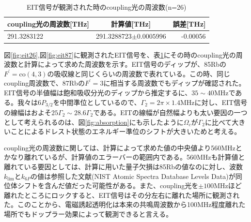 \documentclass[dvipdfmx]{jsarticle}
\begin{document}
\begin{table}[hbtp]
  \caption{EIT信号が観測された時のcoupling光の周波数(n=26)}
  \label{table:eit26}
  \centering
  \begin{tabular}{lcr}
    \hline
    coupling光の周波数[THz] & 計算値[THz] & 誤差[THz]  \\
    \hline \hline
    291.3283122  & 291.3288723$\pm 0.0005996$ & -0.00056  \\
    \hline
  \end{tabular}
\end{table}
図\ref{fig:eit26},図\ref{fig:eit87}に観測されたEIT信号を、表\ref{table:eit26}にその時のcoupling光の周波数と計算によって求めた周波数を示す。EIT信号のディップが、85Rbの$F^{'} = \text{co}(4,3)$の吸収線と同じくらいの周波数で表れている。この時、同じcoupling周波数で、87Rbの$F^{'} = 3$に相当する周波数でもディップが確認された。EIT信号の半値幅は飽和吸収分光のディップから推定するに、$35 \sim 40$MHzである。我々は$6P_{3/2}$を中間準位としているので、$\Gamma_2 = 2\pi \times 1.4$MHzに対し、EIT信号の線幅はおよそ$25\Gamma_2 \sim 28.6\Gamma_2$である。EITの線幅が自然幅よりも太い要因の一つとして考えられるのは、図\ref{fig:absorption}にも示したように$\Omega_c$が$\Gamma_2$に比べて大きいことによるドレスト状態のエネルギー準位のシフトが大きいためと考える。

coupling光の周波数に関しては、計算によって求めた値の中央値より560MHzとかなり離れているが、計算値のエラーバーの範囲内である。560MHzも計算値と離れている要因としては、計算に用いた量子欠損は85Rbの値なのに対し、波数$k_{\text{lim}}$と$k_{6P}$の値は参照した文献\cite{nist}(NIST Atomic Spectra Database Levels Data)が同位体シフトを含んだ値だった可能性がある。また、coupling光を$\pm 100$MHzほど離れたところにロックすると、EIT信号はその分左右に離れた場所に観測された。このことから、電磁誘起透明化は本来の共鳴周波数から100MHz程度離れた場所でもドップラー効果によって観測できると言える。
\end{document}

